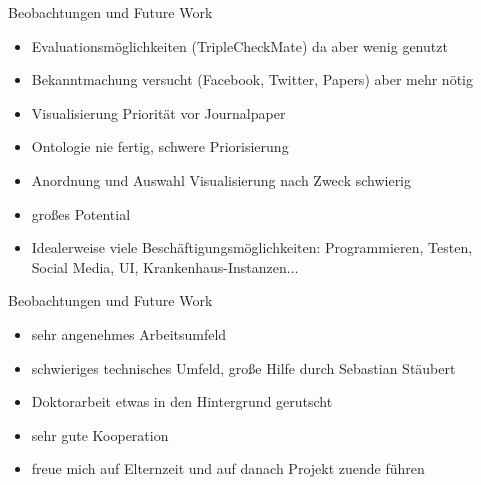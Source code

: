 \documentclass{beamer}
\begin{document}
\begin{frame}{Beobachtungen und Future Work}
\begin{itemize}
\item Evaluationsmöglichkeiten (TripleCheckMate) da aber wenig genutzt
\item Bekanntmachung versucht (Facebook, Twitter, Papers) aber mehr nötig
\item Visualisierung Priorität vor Journalpaper 
\item Ontologie nie fertig, schwere Priorisierung
\item Anordnung und Auswahl Visualisierung nach Zweck schwierig
\item großes Potential
\item Idealerweise viele Beschäftigungsmöglichkeiten: Programmieren, Testen, Social Media, UI, Krankenhaus-Instanzen$\ldots$
\end{itemize}
\end{frame}

\begin{frame}{Beobachtungen und Future Work}
\begin{itemize}
\item sehr angenehmes Arbeitsumfeld
\item schwieriges technisches Umfeld, große Hilfe durch Sebastian Stäubert
\item Doktorarbeit etwas in den Hintergrund gerutscht
\item sehr gute Kooperation
\item freue mich auf Elternzeit und auf danach Projekt zuende führen
\end{itemize}
\end{frame}
\end{document}
